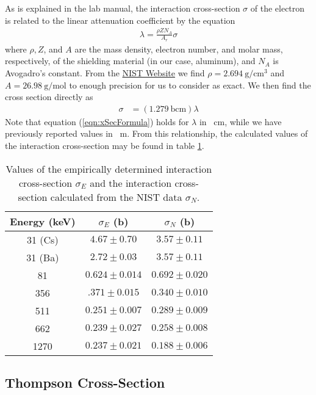 \documentclass[letter]{article}
\begin{document}
As is explained in the lab manual, the interaction cross-section $\sigma$ of the electron is related to the linear attenuation coefficient by the equation
\begin{align}
\lambda = \frac{\rho Z N_A}{A_r} \sigma
\end{align}
where $\rho, Z$, and $A$ are the mass density, electron number, and molar mass, respectively, of the shielding material (in our case, aluminum), and $N_A$ is Avogadro's constant. From the \href{https://physics.nist.gov/cgi-bin/ffast/ffast.pl?Formula=Al&gtype=0&lower=&upper=&density=}{NIST Website} we find $\rho = \qty{2.694}{\g\per\cm\cubed}$ and ${A = \qty{26.98}{\g\per\mol}}$ to enough precision for us to consider as exact. We then find the cross section directly as
\begin{align}
\sigma &= \left( \qty{1.279}{\barn\cm} \right)  \lambda  \label{eqn:xSecFormula}
\end{align} 
Note that equation (\ref{eqn:xSecFormula}) holds for $\lambda$ in \unit{\per\cm}, while we have previously reported values in \unit{\per\m}. From this relationship, the calculated values of the interaction cross-section may be found in table \ref{tab:XSections}.

\begin{table}[h] 
\centering  \begin{tabular}{ c  c   c  } 
Energy (\unit{\kilo\electronvolt}) & $\sigma_E$ (\unit{\barn}) & $\sigma_N$ (\unit{\barn}) \\ \hline
31 (Cs) & $\num{4.67} \pm \num{0.70}$ & $\num{3.57} \pm \num{0.11}$ \\ 
31 (Ba) &$ \num{2.72}\pm\num{0.03} $&$ \num{3.57}\pm\num{0.11}$ \\
81 &  $\num{0.624}\pm\num{0.014}$ & $\num{0.692}\pm\num{0.020}$ \\
356 & $\num{.371}\pm\num{0.015}$ & $\num{0.340}\pm\num{0.010}$ \\
511 & $\num{0.251}\pm 0.007$ & $0.289 \pm 0.009 $\\
662 &  $0.239 \pm 0.027$ & $0.258 \pm 0.008 $\\
1270 &  $0.237 \pm 0.021$ &$ 0.188 \pm 0.006$
\end{tabular}
\caption{Values of the empirically determined interaction cross-section $\sigma_E$ and the interaction cross-section calculated from the NIST data $\sigma_N$.}
\label{tab:XSections}
\end{table}

\subsection{Thompson Cross-Section}
\end{document}
